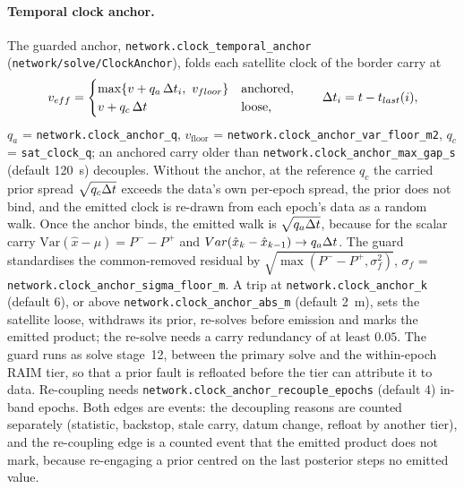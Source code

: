 \documentclass[main.tex]{subfiles}
\begin{document}
\paragraph{Temporal clock anchor.}
The guarded anchor, \texttt{network.clock\_temporal\_anchor}
(\texttt{network/solve/ClockAnchor}), folds each satellite clock of the
border carry at
\begin{equation}
v_{eff} =
\begin{cases}
\max\{v + q_a\,\Delta t_{i},\ v_{floor}\} & \text{anchored},\\
v + q_c\,\Delta t & \text{loose},
\end{cases}
\qquad
\Delta t_{i} = t - t_{last}(i),
\label{eq:veh-anchor}
\end{equation}
$q_a$ = \texttt{network.clock\_anchor\_q}, $v_{\mathrm{floor}}$ =
\texttt{network.clock\_anchor\_var\_floor\_m2}, $q_c$ =
\texttt{sat\_clock\_q}; an anchored carry older than
\texttt{network.clock\_anchor\_max\_gap\_s} (default 120~s) decouples. Without the anchor, at the reference
$q_c$ the carried prior spread $\sqrt{q_c\Delta t}$ exceeds the data's own
per-epoch spread, the prior does not bind, and the emitted clock is
re-drawn from each epoch's data as a random walk. Once the anchor binds, the emitted walk is $\sqrt{q_a\Delta t}$,
because for the scalar carry $\mathrm{Var}(\hat x - \mu) = P^- - P^+$ and
$Var(\hat x_k - \hat x_{k-1}) \to q_a\Delta t$. The guard standardises
the common-removed residual by $\sqrt{\max(P^- - P^+, \sigma_f^2)}$,
$\sigma_f$ = \texttt{network.clock\_anchor\_sigma\_floor\_m}. A trip at
\texttt{network.clock\_anchor\_k} (default 6), or above
\texttt{network.clock\_anchor\_abs\_m} (default 2~m), sets the satellite
loose, withdraws its prior, re-solves before emission and marks the
emitted product; the re-solve needs a carry redundancy of at least $0.05$.
The guard runs as solve stage~12, between the primary solve and the
within-epoch RAIM tier, so that a prior fault is refloated before the
tier can attribute it to data. Re-coupling needs
\texttt{network.clock\_anchor\_recouple\_epochs} (default 4) in-band epochs.
Both edges are events: the decoupling reasons are counted separately
(statistic, backstop, stale carry, datum change, refloat by another tier),
and the re-coupling edge is a counted event that the emitted product does
not mark, because re-engaging a prior centred on the last posterior steps no
emitted value.
\end{document}
